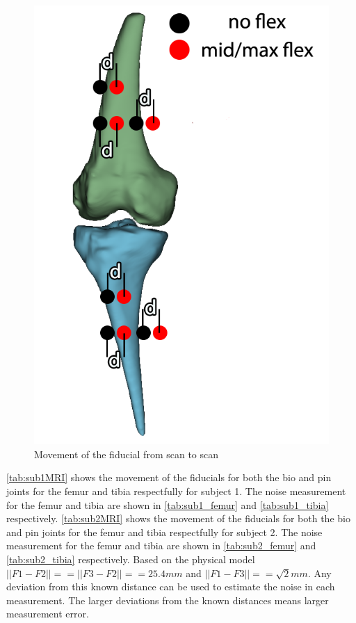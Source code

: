 \begin{figure}
    \centering
    \includegraphics[scale=0.5]{images/mech_design/front view_edit.png}
    \caption{Movement of the fiducial from scan to scan}
    \label{fig:fiducialMovement}
\end{figure}


\autoref{tab:sub1MRI} shows the movement of the fiducials for both the bio and pin joints for the femur and tibia respectfully for subject 1. The noise measurement for the femur and tibia are shown in \autoref{tab:sub1_femur} and \autoref{tab:sub1_tibia} respectively.   \autoref{tab:sub2MRI} shows the movement of the fiducials for both the bio and pin joints for the femur and tibia respectfully for subject 2. The noise measurement for the femur and tibia are shown in  \autoref{tab:sub2_femur} and \autoref{tab:sub2_tibia} respectively. Based on the physical model $||F1-F2|| == ||F3-F2|| ==  25.4mm$ and $||F1-F3|| == \sqrt{2}mm$. Any deviation from this known distance can be used to estimate the noise in each measurement. The larger deviations from the known distances means larger measurement error. 


